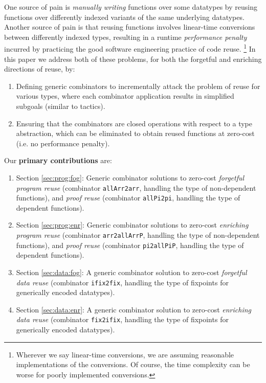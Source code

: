 \documentclass[acmsmall]{acmart}\settopmatter{}
\newcommand{\refsec}[1]{Section \ref{sec:#1}}
\begin{document}
One source of pain is \textit{manually writing} functions
over some datatypes by reusing functions over differently indexed
variants of the same underlying datatypes. Another source of pain is
that reusing functions involves linear-time conversions
between differently indexed types, resulting in a
runtime \textit{performance penalty} incurred by practicing the good software
engineering practice of code reuse. \footnote{
  Wherever we say linear-time conversions, we are assuming reasonable
  implementations of the conversions. Of course, the time complexity
  can be worse for poorly implemented conversions.
}
In this paper we address both of
these problems, for both the forgetful and enriching directions of
reuse, by:
\begin{enumerate}
\item Defining generic combinators to incrementally attack the problem
  of reuse for various types, where each combinator application
  results in simplified subgoals (similar to tactics).
\item Ensuring that the combinators are closed operations with respect to
  a type abstraction, which can be eliminated to obtain reused
  functions at zero-cost (i.e. no performance penalty).
\end{enumerate}
Our \textbf{primary contributions} are:
\begin{enumerate}
\item{\refsec{prog:fog}:} Generic combinator solutions to zero-cost
  \textit{forgetful program reuse}
  (combinator \verb;allArr2arr;, handling the type of non-dependent functions),
  and \textit{proof reuse} (combinator \verb;allPi2pi;,
  handling the type of dependent functions).
\item{\refsec{prog:enr}:} Generic combinator solutions to zero-cost
  \textit{enriching program reuse}
  (combinator \verb;arr2allArrP;, handling the type of non-dependent functions),
  and \textit{proof reuse} (combinator \verb;pi2allPiP;,
  handling the type of dependent functions).
\item{\refsec{data:fog}:} A generic combinator solution to zero-cost
  \textit{forgetful data reuse}
  (combinator \verb;ifix2fix;, handling the type of fixpoints for
  generically encoded datatypes).
\item{\refsec{data:enr}:} A generic combinator solution to zero-cost
  \textit{enriching data reuse}
  (combinator \verb;fix2ifix;, handling the type of fixpoints for
  generically encoded datatypes).
\end{enumerate}
\end{document}
